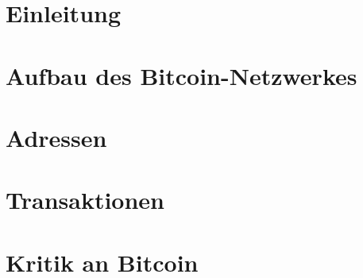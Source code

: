 \documentclass[12pt]{report}
\begin{document}


\tableofcontents

\chapter{Einleitung}


\chapter{Aufbau des Bitcoin-Netzwerkes}


\chapter{Adressen}


\chapter{Transaktionen}


\chapter{Kritik an Bitcoin}

\end{document}
